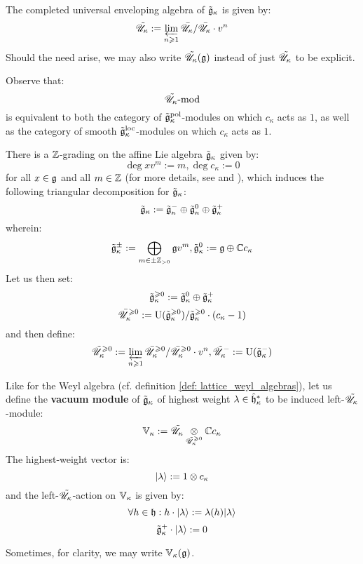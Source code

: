         \begin{definition}
            The completed universal enveloping algebra of $\tilde{\mathfrak{g}}_{\kappa}$ is given by:
                $$\tilde{\mathscr{U}}_{\kappa} := \varprojlim_{n \geqslant 1} \bar{\mathscr{U}}_{\kappa}/\bar{\mathscr{U}}_{\kappa} \cdot v^n$$
            Should the need arise, we may also write $\tilde{\mathscr{U}}_{\kappa}(\mathfrak{g})$ instead of just $\tilde{\mathscr{U}}_{\kappa}$ to be explicit.
        \end{definition}
        \begin{remark}
            Observe that:
                $$\tilde{\mathscr{U}}_{\kappa}\text{-}\mathrm{mod}$$
            is equivalent to both the category of $\tilde{\mathfrak{g}}_{\kappa}^{\mathrm{pol}}$-modules on which $c_{\kappa}$ acts as $1$, as well as the category of smooth $\tilde{\mathfrak{g}}_{\kappa}^{\mathrm{loc}}$-modules on which $c_{\kappa}$ acts as $1$.
        \end{remark}
        There is a $\mathbb{Z}$-grading on the affine Lie algebra $\tilde{\mathfrak{g}}_{\kappa}$ given by:
            $$\deg x v^m := m, \deg c_{\kappa} := 0$$
        for all $x \in \mathfrak{g}$ and all $m \in \mathbb{Z}$ (for more details, see \cite{kassel_universal_central_extensions_of_lie_algebras} and \cite[Subsection 2.3.2]{msc_thesis_gamma_extended_toroidal_lie_algebras}), which induces the following triangular decomposition for $\tilde{\mathfrak{g}}_{\kappa}$:
            $$\tilde{\mathfrak{g}}_{\kappa} := \tilde{\mathfrak{g}}_{\kappa}^- \oplus \tilde{\mathfrak{g}}_{\kappa}^0 \oplus \tilde{\mathfrak{g}}_{\kappa}^+$$
        wherein:
            $$\tilde{\mathfrak{g}}_{\kappa}^{\pm} := \bigoplus_{m \in \pm \mathbb{Z}_{> 0}} \mathfrak{g} v^m, \tilde{\mathfrak{g}}_{\kappa}^0 := \mathfrak{g} \oplus \mathbb{C} c_{\kappa}$$
        Let us then set:
            $$\tilde{\mathfrak{g}}_{\kappa}^{\geqslant 0} := \tilde{\mathfrak{g}}_{\kappa}^0 \oplus \tilde{\mathfrak{g}}_{\kappa}^+$$
            $$\bar{\mathscr{U}}_{\kappa}^{\geqslant 0} := \mathrm{U}(\tilde{\mathfrak{g}}_{\kappa}^{\geqslant 0})/\tilde{\mathfrak{g}}_{\kappa}^{\geqslant 0} \cdot (c_{\kappa} - 1)$$
        and then define:
            $$\tilde{\mathscr{U}}_{\kappa}^{\geqslant 0} := \varprojlim_{n \geqslant 1} \bar{\mathscr{U}}_{\kappa}^{\geqslant 0}/\bar{\mathscr{U}}_{\kappa}^{\geqslant 0} \cdot v^n, \tilde{\mathscr{U}}_{\kappa}^- := \mathrm{U}(\tilde{\mathfrak{g}}_{\kappa}^-)$$
        \begin{definition}
            Like for the Weyl algebra (cf. definition \ref{def: lattice_weyl_algebras}), let us define the \textbf{vacuum module} of $\tilde{\mathfrak{g}}_{\kappa}$ of highest weight $\lambda \in \hat{\mathfrak{h}}_{\kappa}^*$ to be induced left-$\tilde{\mathscr{U}}_{\kappa}$-module:
                $$\V_{\kappa} := \tilde{\scrU}_{\kappa} \tensor_{\tilde{\scrU}_{\kappa}^{\geq 0}} \bbC c_{\kappa}$$
            The highest-weight vector is:
                $$\ket{\lambda} := 1 \tensor c_{\kappa}$$
            and the left-$\tilde{\mathscr{U}}_{\kappa}$-action on $\mathbb{V}_{\kappa}$ is given by:
                $$\forall h \in \mathfrak{h}: h \cdot \lvert {\lambda} \rangle := \lambda(h) \lvert {\lambda} \rangle$$
                $$\tilde{\mathfrak{g}}_{\kappa}^+ \cdot \lvert {\lambda} \rangle := 0$$
            
            Sometimes, for clarity, we may write $\mathbb{V}_{\kappa}(\mathfrak{g})$.
        \end{definition}
